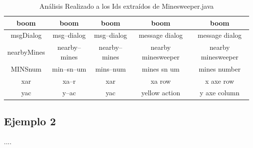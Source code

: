 \begin{table}
\begin{tabular}{| c | c | c | c | c |}
boom&boom&boom&boom&boom\\ \hline
msgDialog&msg--dialog&msg--dialog&message dialog&message dialog\\ \hline
nearbyMines&nearby--mines&nearby--mines&nearby minesweeper&nearby minesweeper\\ \hline
MINSnum&min--sn--um&mins--num&mines sn um&mines number\\ \hline
xar&xa--r&xar&xa row&x axe row\\ \hline
yac&y--ac&yac&yellow action&y axe column\\ \hline

  \end{tabular}
	 
   \caption{Análisis Realizado a los Ids extraídos de Minesweeper.java}
   \label{tabla5}
     
\end{table}

\clearpage %

\subsection{Ejemplo 2}


....